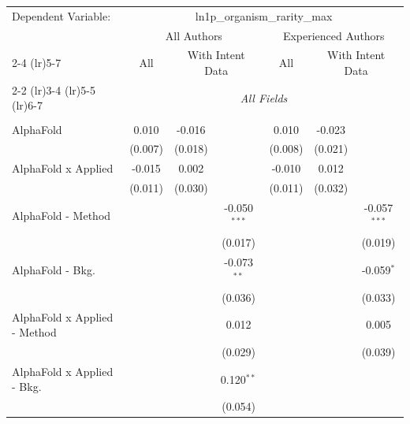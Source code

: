 \begingroup
\centering
\begin{tabular}{lcccccc}
   \tabularnewline \midrule \midrule
   Dependent Variable: & \multicolumn{6}{c}{ln1p\_organism\_rarity\_max}\\
 & \multicolumn{3}{c}{All Authors} & \multicolumn{3}{c}{Experienced Authors} \\
\cmidrule(lr){2-4} \cmidrule(lr){5-7}
 & \multicolumn{1}{c}{All} & \multicolumn{2}{c}{With Intent Data} & \multicolumn{1}{c}{All} & \multicolumn{2}{c}{With Intent Data} \\
\cmidrule(lr){2-2} \cmidrule(lr){3-4} \cmidrule(lr){5-5} \cmidrule(lr){6-7}
 & \multicolumn{6}{c}{\textit{All Fields}} \\ \\
   AlphaFold                      & 0.010        & -0.016      &                & 0.010        & -0.023      &   \\   
                                  & (0.007)      & (0.018)     &                & (0.008)      & (0.021)     &   \\   
   AlphaFold x Applied            & -0.015       & 0.002       &                & -0.010       & 0.012       &   \\   
                                  & (0.011)      & (0.030)     &                & (0.011)      & (0.032)     &   \\   
   AlphaFold - Method             &              &             & -0.050$^{***}$ &              &             & -0.057$^{***}$\\   
                                  &              &             & (0.017)        &              &             & (0.019)\\   
   AlphaFold - Bkg.               &              &             & -0.073$^{**}$  &              &             & -0.059$^{*}$\\   
                                  &              &             & (0.036)        &              &             & (0.033)\\   
   AlphaFold x Applied - Method   &              &             & 0.012          &              &             & 0.005\\   
                                  &              &             & (0.029)        &              &             & (0.039)\\   
   AlphaFold x Applied - Bkg.     &              &             & 0.120$^{**}$   &              &             &   \\   
                                  &              &             & (0.054)        &              &             &   \\   

\end{tabular}
